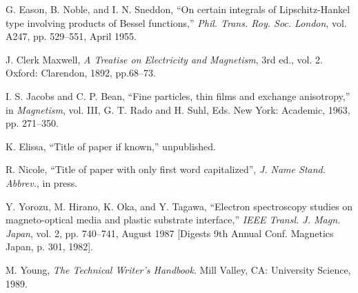 %
%
%

\begin{thebibliography}{10}

 G. Eason, B. Noble, and I. N. Sneddon, ``On certain integrals of
Lipschitz-Hankel type involving products of Bessel functions,'' {\em Phil.
Trans. Roy. Soc. London}, vol. A247, pp. 529--551, April 1955.

 J. Clerk Maxwell, {\em A Treatise on Electricity and Magnetism}, 3rd ed.,
vol. 2. Oxford: Clarendon, 1892, pp.68--73.

 I. S. Jacobs and C. P. Bean, ``Fine particles, thin films and exchange
anisotropy,'' in {\em Magnetism}, vol. III, G. T. Rado and H. Suhl, Eds.
New York: Academic, 1963, pp. 271--350.

 K. Elissa, ``Title of paper if known,'' unpublished.

 R. Nicole, ``Title of paper with only first word capitalized'',
{\em J. Name Stand. Abbrev.}, in press.

 Y. Yorozu, M. Hirano, K. Oka, and Y. Tagawa, ``Electron spectroscopy
studies on magneto-optical media and plastic substrate interface,'' {\em
IEEE Transl. J. Magn. Japan}, vol. 2, pp. 740--741, August 1987 [Digests
9th Annual Conf. Magnetics Japan, p. 301, 1982].

 M. Young, {\em The Technical Writer's Handbook}. Mill Valley, CA: University
Science, 1989.


\end{thebibliography}



